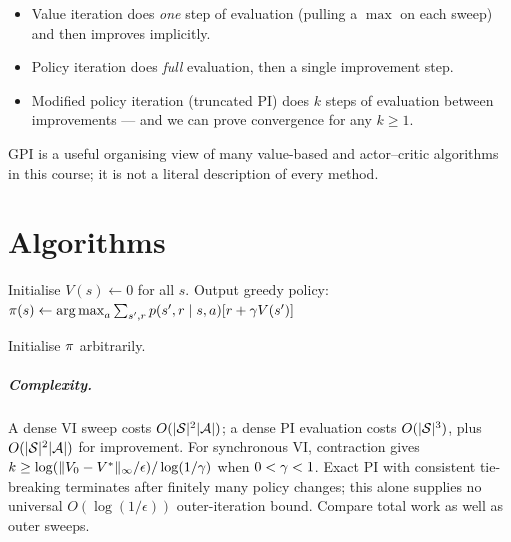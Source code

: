 \documentclass[11pt,oneside]{scrbook}
\begin{document}
\begin{itemize}\setlength\itemsep{1pt}
  \item Value iteration does \emph{one} step of evaluation
        (pulling a $\max$ on each sweep) and then improves implicitly.
  \item Policy iteration does \emph{full} evaluation, then a single
        improvement step.
  \item Modified policy iteration (truncated PI) does $k$ steps of evaluation
        between improvements --- and we can prove convergence for any $k\ge 1$.
\end{itemize}

GPI is a useful organising view of many value-based and actor--critic
algorithms in this course; it is not a literal description of every method.

\chapter{Algorithms}

\begin{algorithm}[H]
\SetAlgoLined
{}
Initialise $V(s) \gets 0$ for all $s$.\;
Output greedy policy: $\pi(s) \gets \operatorname*{arg\,max}_a \sum_{s',r}p(s',r\mid s,a)[r + \gamma V(s')]$\;
\caption{In-place (Gauss--Seidel) value iteration.}
\end{algorithm}

\begin{algorithm}[H]
\SetAlgoLined
{}
Initialise $\pi$ arbitrarily.\;
\caption{Howard's policy iteration.}
\end{algorithm}

\paragraph{Complexity.}
A dense VI sweep costs $O(|\mathcal{S}|^2|\mathcal{A}|)$; a dense PI evaluation
costs $O(|\mathcal{S}|^3)$, plus $O(|\mathcal{S}|^2|\mathcal{A}|)$ for improvement.
For synchronous VI, contraction gives
$k\ge \log(\|V_0-V^*\|_\infty/\epsilon)/\log(1/\gamma)$ when
$0<\gamma<1$. Exact PI with consistent tie-breaking terminates after finitely
many policy changes; this alone supplies no universal $O(\log(1/\epsilon))$
outer-iteration bound. Compare total work as well as outer sweeps.
\end{document}
